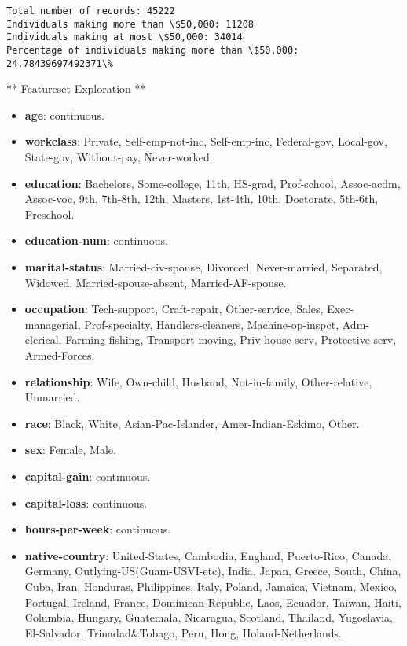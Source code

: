 \documentclass[11pt]{article}
\providecommand{\tightlist}{%
      \setlength{\itemsep}{0pt}\setlength{\parskip}{0pt}}
\begin{document}
    \begin{Verbatim}[commandchars=\\\{\}]
Total number of records: 45222
Individuals making more than \$50,000: 11208
Individuals making at most \$50,000: 34014
Percentage of individuals making more than \$50,000: 24.78439697492371\%

    \end{Verbatim}

    ** Featureset Exploration **

\begin{itemize}
\tightlist
\item
  \textbf{age}: continuous.
\item
  \textbf{workclass}: Private, Self-emp-not-inc, Self-emp-inc,
  Federal-gov, Local-gov, State-gov, Without-pay, Never-worked.
\item
  \textbf{education}: Bachelors, Some-college, 11th, HS-grad,
  Prof-school, Assoc-acdm, Assoc-voc, 9th, 7th-8th, 12th, Masters,
  1st-4th, 10th, Doctorate, 5th-6th, Preschool.
\item
  \textbf{education-num}: continuous.
\item
  \textbf{marital-status}: Married-civ-spouse, Divorced, Never-married,
  Separated, Widowed, Married-spouse-absent, Married-AF-spouse.
\item
  \textbf{occupation}: Tech-support, Craft-repair, Other-service, Sales,
  Exec-managerial, Prof-specialty, Handlers-cleaners, Machine-op-inspct,
  Adm-clerical, Farming-fishing, Transport-moving, Priv-house-serv,
  Protective-serv, Armed-Forces.
\item
  \textbf{relationship}: Wife, Own-child, Husband, Not-in-family,
  Other-relative, Unmarried.
\item
  \textbf{race}: Black, White, Asian-Pac-Islander, Amer-Indian-Eskimo,
  Other.
\item
  \textbf{sex}: Female, Male.
\item
  \textbf{capital-gain}: continuous.
\item
  \textbf{capital-loss}: continuous.
\item
  \textbf{hours-per-week}: continuous.
\item
  \textbf{native-country}: United-States, Cambodia, England,
  Puerto-Rico, Canada, Germany, Outlying-US(Guam-USVI-etc), India,
  Japan, Greece, South, China, Cuba, Iran, Honduras, Philippines, Italy,
  Poland, Jamaica, Vietnam, Mexico, Portugal, Ireland, France,
  Dominican-Republic, Laos, Ecuador, Taiwan, Haiti, Columbia, Hungary,
  Guatemala, Nicaragua, Scotland, Thailand, Yugoslavia, El-Salvador,
  Trinadad\&Tobago, Peru, Hong, Holand-Netherlands.
\end{itemize}
\end{document}
